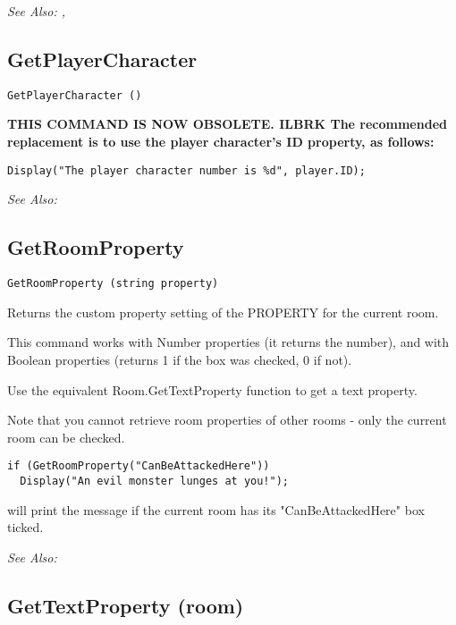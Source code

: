 \it{See Also:} ,


\subsection{GetPlayerCharacter}\label{GetPlayerCharacter}%

\begin{verbatim}
GetPlayerCharacter ()
\end{verbatim}
\bf{THIS COMMAND IS NOW OBSOLETE.} ILBRK
The recommended replacement is to use the player character's ID property, as follows:

\begin{verbatim}
Display("The player character number is %d", player.ID);
\end{verbatim}

\it{See Also:} 


\subsection{GetRoomProperty}\label{GetRoomProperty}%

\begin{verbatim}
GetRoomProperty (string property)
\end{verbatim}
Returns the custom property setting of the PROPERTY for the current room.

This command works with Number properties (it returns the number), and with Boolean
properties (returns 1 if the box was checked, 0 if not).

Use the equivalent Room.GetTextProperty function to get a text property.

Note that you cannot retrieve room properties of other rooms - only the current room
can be checked.

\begin{verbatim}
if (GetRoomProperty("CanBeAttackedHere"))
  Display("An evil monster lunges at you!");
\end{verbatim}
will print the message if the current room has its "CanBeAttackedHere" box ticked.

\it{See Also:} 


\subsection{GetTextProperty (room)}\label{Room.GetTextProperty}%

